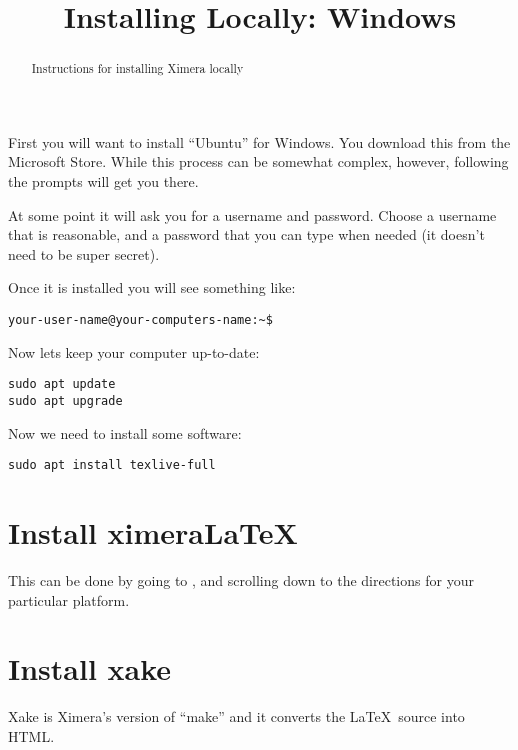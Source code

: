 \documentclass{ximera}
\title{Installing Locally: Windows}
\begin{document}
\begin{abstract}
Instructions for installing Ximera locally
\end{abstract}
\maketitle

First you will want to install ``Ubuntu'' for Windows. You download
this from the Microsoft Store. While this process can be somewhat
complex, however, following the prompts will get you there.

At some point it will ask you for a username and password. Choose a
username that is reasonable, and a password that you can type when
needed (it doesn't need to be super secret).

Once it is installed you will see something like:

\begin{verbatim}
your-user-name@your-computers-name:~$
\end{verbatim}

Now lets keep your computer up-to-date:

\begin{verbatim}
sudo apt update
sudo apt upgrade
\end{verbatim}

Now we need to install some software:

\begin{verbatim}
sudo apt install texlive-full 
\end{verbatim}



\section{Install ximeraLaTeX}

This can be done by going to , and scrolling
down to the directions for your particular platform.


\section{Install xake}

Xake is Ximera's version of ``make'' and it converts the
\LaTeX\ source into HTML.
\end{document}

